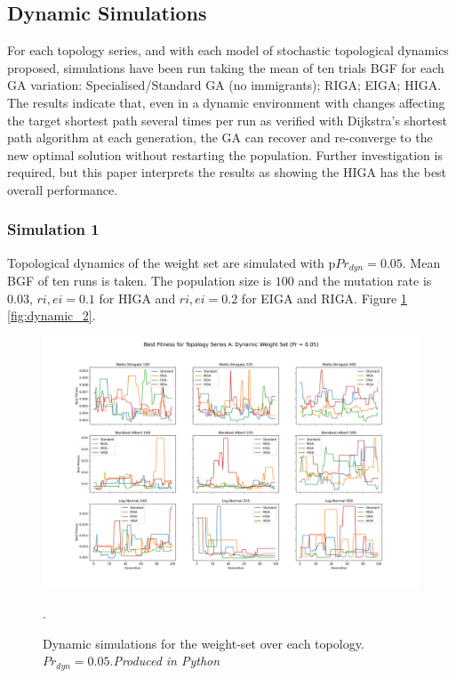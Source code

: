 \documentclass[
	a4paper, %
	10pt, %
	unnumberedsections, %
	twoside, %
]{LTJournalArticle}
\begin{document}
\subsection{Dynamic Simulations} 

For each topology series, and with each model of stochastic topological dynamics proposed, simulations have been run taking the mean of ten trials BGF for each GA variation: Specialised/Standard GA (no immigrants); RIGA; EIGA; HIGA. The results indicate that, even in a dynamic environment with changes affecting the target shortest path several times per run as verified with Dijkstra's shortest path algorithm at each generation, the GA can recover and re-converge to the new optimal solution without restarting the population. Further investigation is required, but this paper interprets the results as showing the HIGA has the best overall performance. \\ 

\subsubsection{Simulation 1} Topological dynamics of the weight set are simulated with p\(Pr_{dyn} = 0.05\). Mean BGF  of ten runs is taken. The population size is \(100\) and the mutation rate is \(0.03\), \(ri, ei = 0.1\) for HIGA and \(ri, ei = 0.2\) for EIGA and RIGA. Figure \ref{fig:dynamic_1} \ref{fig:dynamic_2}. 

\begin{figure}
	\includegraphics[width=\linewidth]{Figures/sims/dynamic/series_a_weight.jpg}
	\caption{Dynamic simulations for the weight-set over each topology. \(Pr_{dyn} = 0.05\).\emph{Produced in Python}}. 
	\label{fig:dynamic_1}
\end{figure}
\end{document}
